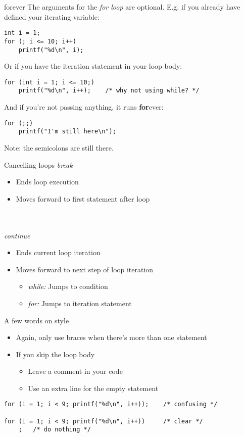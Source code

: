 \begin{frame}[fragile]{forever}
	The arguments for the \textit{for loop} are optional. E.g. if you already have defined your iterating variable:
	\begin{lstlisting}[numbers=none]
int i = 1;
for (; i <= 10; i++)
	printf("%d\n", i);
\end{lstlisting}
	Or if you have the iteration statement in your loop body:
	\begin{lstlisting}[numbers=none]
for (int i = 1; i <= 10;)
	printf("%d\n", i++);	/* why not using while? */
\end{lstlisting}
	And if you're not passing anything, it runs \textbf{for}ever:
	\begin{lstlisting}[numbers=none]
for (;;)
	printf("I'm still here\n");
\end{lstlisting}
Note: the semicolons are still there.
\end{frame}
\begin{frame}{Cancelling loops}
	\textit{break}
	\begin{itemize}
		\item Ends loop execution
		\item Moves forward to first statement after loop
	\end{itemize}\ \\\ \\
	\textit{continue}
	\begin{itemize}
		\item Ends current loop iteration
		\item Moves forward to next step of loop iteration
		\begin{itemize}
			\item\textit{while:} Jumps to condition
			\item\textit{for:} Jumps to iteration statement
		\end{itemize}
	\end{itemize}
\end{frame}
\begin{frame}[fragile]{A few words on style}
	\begin{itemize}
		\item Again, only use braces when there's more than one statement
		\item If you skip the loop body
		\begin{itemize}
			\item Leave a comment in your code
			\item Use an extra line for the empty statement
		\end{itemize}
	\end{itemize}
		\begin{lstlisting}[numbers=none]
for (i = 1; i < 9; printf("%d\n", i++));	/* confusing */

for (i = 1; i < 9; printf("%d\n", i++))		/* clear */
	;	/* do nothing */
\end{lstlisting}
\end{frame}
